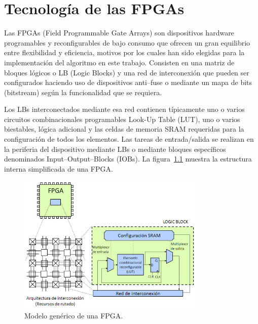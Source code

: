 \cleardoublepage
\mbox{}

\chapter{Tecnología de las FPGAs}
\label{ch:chapter3}

Las FPGAs (Field Programmable Gate Arrays) \cite{biblio:Tesis_Carlos} son dispositivos hardware programables y reconfigurables de bajo consumo que ofrecen un gran equilibrio entre flexibilidad y eficiencia, motivos por los cuales han sido elegidas para la implementación del algoritmo en este trabajo. Consisten en una matriz de bloques lógicos o LB (Logic Blocks) y una red de interconexión que pueden ser configurados haciendo uso de dispositivos anti–fuse \cite{biblio:Tesis_Carlos} o mediante un mapa de bits (bitstream) \cite{biblio:bitstream} según la funcionalidad que se requiera.

Los LBs interconectados mediante esa red contienen típicamente uno o varios circuitos combinacionales programables Look-Up Table (LUT), uno o varios biestables, lógica adicional y las celdas de memoria SRAM requeridas para la configuración de todos los elementos. Las tareas de entrada/salida se realizan en la periferia del dispositivo mediante LBs o mediante bloques específicos denominados Input–Output–Blocks (IOBs). La figura~\ref{fig:modelo generico fpga} \cite{biblio:Tesis_Carlos} muestra la estructura interna simplificada de una FPGA.

\begin{figure}
  \centering
    \includegraphics[width=0.8\textwidth]{Imagenes/ModeloGenericoFPGA.png}
  \caption{Modelo genérico de una FPGA.}
  \label{fig:modelo generico fpga}
\end{figure}

